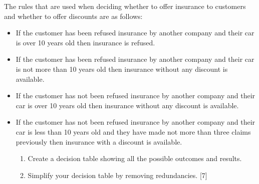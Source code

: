 \item The rules that are used when deciding whether to offer insurance to
customers and whether to offer discounts are as follows:
\begin{itemize}
\item If the customer has been refused insurance by another company and
their car is over 10 years old then insurance is refused.
\item If the customer has been refused insurance by another company and
their car is not more than 10 years old then insurance without any
discount is available. 
\item If the customer has not been refused insurance by another company
and their car is over 10 years old then insurance without any discount
is available. 
\item If the customer has not been refused insurance by another company
and their car is less than 10 years old and they have made not more
than three claims previously then insurance with a discount is available.
\begin{enumerate}
\item Create a decision table showing all the possible outcomes and results. 
\item Simplify your decision table by removing redundancies. \hfill{}{[}7{]}
\end{enumerate}
\end{itemize}
